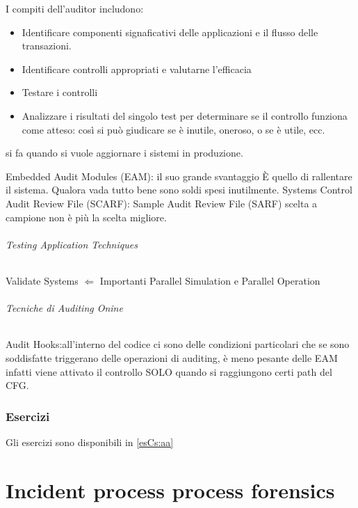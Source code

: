 I compiti dell'auditor includono:
\begin{itemize}
\item Identificare componenti signaficativi delle applicazioni e 
il flusso delle transazioni.
\item 
Identificare controlli appropriati e valutarne l'efficacia
\item 
Testare i controlli
\item Analizzare i risultati del singolo test per determinare se 
il controllo funziona come atteso: così si può giudicare se è inutile,
oneroso, o se è utile, ecc.
\end{itemize}



si fa quando si vuole aggiornare i sistemi in produzione.

Embedded Audit Modules (EAM): il suo grande svantaggio È quello di rallentare il
sistema. Qualora vada tutto bene sono soldi spesi inutilmente.
Systems Control Audit Review File (SCARF):
Sample Audit Review File (SARF) scelta a campione non è più la scelta migliore.

\paragraph{Testing Application Techniques}
Validate Systems $\Leftarrow$ Importanti Parallel Simulation e Parallel
Operation



\paragraph{Tecniche di Auditing Onine}
Audit Hooks:all'interno del codice ci sono delle condizioni particolari che se
sono soddisfatte triggerano delle operazioni di auditing, è meno pesante delle
EAM infatti viene attivato il controllo SOLO quando si raggiungono certi path
del CFG.

\section{Esercizi}

Gli esercizi sono disponibili in \ref{esCs:aa}

\part{Incident process process forensics}

